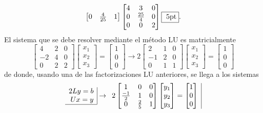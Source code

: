 \documentclass[11pt]{article}
\begin{document}
\begin{enumerate}
$$\begin{bmatrix}
    0 & \frac{4}{25} & 1
    \end{bmatrix}
    \begin{bmatrix}
    4 & 3 & 0 \\
    0 & \frac{25}{4} & 0\\
    0 & 0 & 2
    \end{bmatrix} \fbox{ 5pt}.
$$
El sistema que se debe resolver mediante el m\'etodo LU es matricialmente
$$
\begin{bmatrix}
4 & 2 & 0 	\\
-2 & 4 & 0 	\\
0 & 2 & 2 
\end{bmatrix}
\begin{bmatrix}
x_1 \\x_2 \\ x_3
\end{bmatrix}
=
\begin{bmatrix}
1 \\ 0 \\ 0
\end{bmatrix}
\rightarrow 
2
\begin{bmatrix}
2 & 1 & 0 	\\
-1 & 2 & 0 	\\
0 & 1 & 1 
\end{bmatrix}
\begin{bmatrix}
x_1 \\x_2 \\ x_3
\end{bmatrix}
=
\begin{bmatrix}
1 \\ 0 \\ 0
\end{bmatrix}
$$
de donde, usando una de las factorizaciones LU anteriores, se llega a los sistemas
$$
\begin{array}{r|}
2Ly=b\\
Ux=y\\ 
\hline
\end{array}
\rightarrow 
\begin{array}{c|}
    2
    \begin{bmatrix}
    1 & 0 & 0\\
    \frac{-1}{2} & 1 & 0\\
    0 & \frac{2}{5} & 1
    \end{bmatrix}
    \begin{bmatrix} y_1\\y_2\\y_3 	\end{bmatrix}
    =
    \begin{bmatrix} 1 \\ 0 \\ 0 	\end{bmatrix}

\end{array}$$
\end{enumerate}
\end{document}
